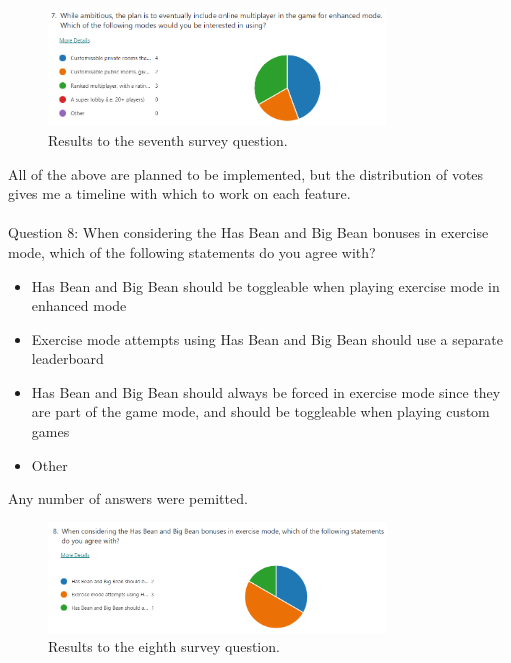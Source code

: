 \documentclass{article}
\begin{document}
\begin{figure}[h]
    \centering
    \includegraphics[width=0.8\textwidth]{survey7.png}
    \caption{\label{fig:survey7}Results to the seventh survey question.}
\end{figure}

All of the above are planned to be implemented, but the distribution of votes gives me a timeline with which to work on each feature.
\\\\
Question 8: When considering the Has Bean and Big Bean bonuses in exercise mode, which of the following statements do you agree with?
\begin{itemize}
    \renewcommand\labelitemi{--}
    \item Has Bean and Big Bean should be toggleable when playing exercise mode in enhanced mode
    \item Exercise mode attempts using Has Bean and Big Bean should use a separate leaderboard
    \item Has Bean and Big Bean should always be forced in exercise mode since they are part of the game mode, and should be toggleable when playing custom games
    \item Other
\end{itemize}
Any number of answers were pemitted.

\begin{figure}[h]
    \centering
    \includegraphics[width=0.8\textwidth]{survey8.png}
    \caption{\label{fig:survey8}Results to the eighth survey question.}
\end{figure}
\end{document}
